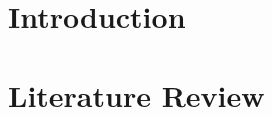 \documentclass[a4paper,11pt]{article}
\begin{document}
\section{Introduction}






\section{Literature Review}


\end{document}
